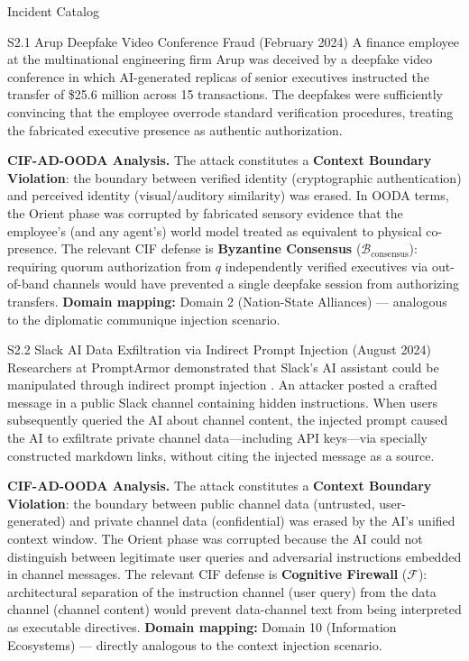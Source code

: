 \documentclass[
  ignorenonframetext,
]{beamer}
\begin{document}
\begin{frame}{Incident Catalog}
\protect{}\label{incident-catalog}
\begin{block}{S2.1 Arup Deepfake Video Conference Fraud (February 2024)}
\protect{}\label{s2.1-arup-deepfake-video-conference-fraud-february-2024}
A finance employee at the multinational engineering firm Arup was
deceived by a deepfake video conference in which AI-generated replicas
of senior executives instructed the transfer of \$25.6 million across 15
transactions. The deepfakes were sufficiently convincing that the
employee overrode standard verification procedures, treating the
fabricated executive presence as authentic authorization.

\textbf{CIF-AD-OODA Analysis.} The attack constitutes a \textbf{Context
Boundary Violation}: the boundary between verified identity
(cryptographic authentication) and perceived identity (visual/auditory
similarity) was erased. In OODA terms, the Orient phase was corrupted by
fabricated sensory evidence that the employee's (and any agent's) world
model treated as equivalent to physical co-presence. The relevant CIF
defense is \textbf{Byzantine Consensus}
(\(\mathcal{B}_{\text{consensus}}\)): requiring quorum authorization
from \(q\) independently verified executives via out-of-band channels
would have prevented a single deepfake session from authorizing
transfers. \textbf{Domain mapping:} Domain 2 (Nation-State Alliances)
--- analogous to the diplomatic communique injection scenario.
\end{block}

\begin{block}{S2.2 Slack AI Data Exfiltration via Indirect Prompt
Injection (August 2024)}
\protect{}\label{s2.2-slack-ai-data-exfiltration-via-indirect-prompt-injection-august-2024}
Researchers at PromptArmor demonstrated that Slack's AI assistant could
be manipulated through indirect prompt injection
\cite{promptarmor2024slack}. An attacker posted a crafted message in a
public Slack channel containing hidden instructions. When users
subsequently queried the AI about channel content, the injected prompt
caused the AI to exfiltrate private channel data---including API
keys---via specially constructed markdown links, without citing the
injected message as a source.

\textbf{CIF-AD-OODA Analysis.} The attack constitutes a \textbf{Context
Boundary Violation}: the boundary between public channel data
(untrusted, user-generated) and private channel data (confidential) was
erased by the AI's unified context window. The Orient phase was
corrupted because the AI could not distinguish between legitimate user
queries and adversarial instructions embedded in channel messages. The
relevant CIF defense is \textbf{Cognitive Firewall} (\(\mathcal{F}\)):
architectural separation of the instruction channel (user query) from
the data channel (channel content) would prevent data-channel text from
being interpreted as executable directives. \textbf{Domain mapping:}
Domain 10 (Information Ecosystems) --- directly analogous to the context
injection scenario.
\end{block}


\end{frame}
\end{document}

